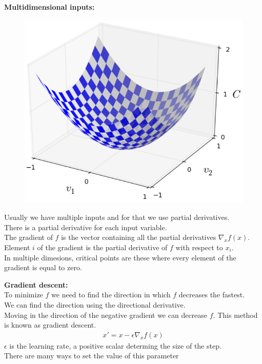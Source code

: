 \documentclass[10pt, compress]{beamer}
\begin{document}
\begin{frame}
  \textbf{Multidimensional inputs:}
  \vspace{1cm}
  \begin{multicols}{2}
    \begin{figure}
      \includegraphics[width=1\linewidth]{imgs/gd_1}
    \end{figure}


    \columnbreak

  Usually we have multiple inputs and for that we use partial derivatives.\\
  There is a partial derivative for each input variable. \\
  The gradient of $f$ is the vector containing all the partial derivatives $\nabla_x f(x)$. Element $i$ of the gradient is the partial derivative of $f$ with respect to $x_i$. \\
  In multiple dimesions, critical points are these where every element of the gradient is equal to zero.
\end{multicols}
\end{frame}

\begin{frame}
  \textbf{Gradient descent:}\\
  To minimize $f$ we need to find the direction in which $f$ decreases the fastest.\\
  We can find the direction using the directional derivative. \\
  Moving in the direction of the negative gradient we can decrease $f$.
  This method is known as gradient descent.\\
  \begin{eqnarray}
    x' = x - \epsilon \nabla_xf(x)
    \nonumber
  \end{eqnarray}
  $\epsilon$ is the learning rate, a positive scalar determing the size of the step.\\
  There are many ways to set the value of this parameter\\


\end{frame}
\end{document}
